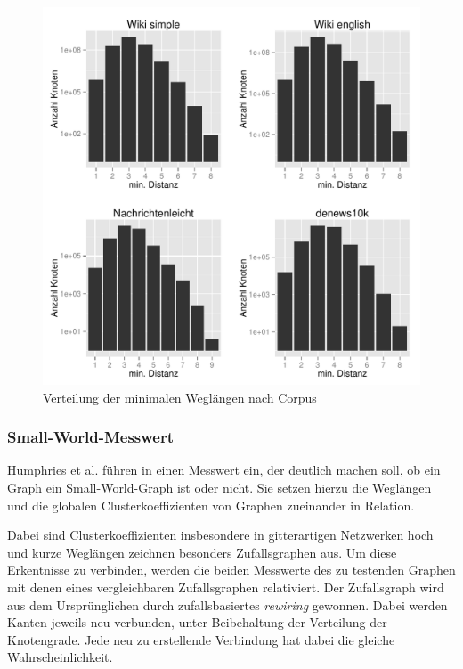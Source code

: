 \documentclass[11pt, a4paper]{article}
\begin{document}
\begin{figure}[ht]
    \centering
        \includegraphics[scale=.75]{mdh_plots.pdf}
    \caption{Verteilung der minimalen Weglängen nach Corpus}
    \label{fig-mdh}
\end{figure}


\subsubsection{Small-World-Messwert}

Humphries et al. führen in \cite{Humphries2006} einen Messwert ein, der deutlich
machen soll, ob ein Graph ein Small-World-Graph ist oder nicht. Sie setzen hierzu
die Weglängen und die globalen Clusterkoeffizienten von Graphen zueinander in Relation.

Dabei sind Clusterkoeffizienten insbesondere in gitterartigen Netzwerken hoch und
kurze Weglängen zeichnen besonders Zufallsgraphen aus. Um diese Erkentnisse zu
verbinden, werden die beiden Messwerte des zu testenden Graphen mit denen eines
vergleichbaren Zufallsgraphen relativiert. Der Zufallsgraph wird aus dem 
Ursprünglichen durch zufallsbasiertes \emph{rewiring} gewonnen.
Dabei werden Kanten jeweils neu verbunden, unter Beibehaltung der Verteilung
der Knotengrade.
Jede neu zu erstellende Verbindung hat dabei die gleiche Wahrscheinlichkeit.
\end{document}
